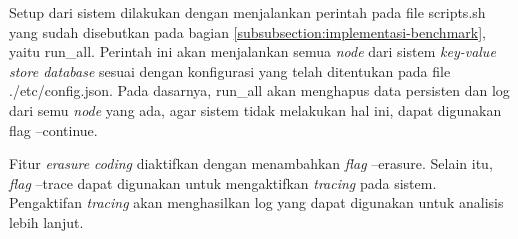 Setup dari sistem dilakukan dengan menjalankan perintah pada file scripts.sh yang sudah disebutkan pada bagian \ref{subsubsection:implementasi-benchmark}, yaitu run\_all. Perintah ini akan menjalankan semua \textit{node} dari sistem \textit{key-value store database} sesuai dengan konfigurasi yang telah ditentukan pada file ./etc/config.json. Pada dasarnya, run\_all akan menghapus data persisten dan log dari semu \textit{node} yang ada, agar sistem tidak melakukan hal ini, dapat digunakan flag --continue.

Fitur \textit{erasure coding} diaktifkan dengan menambahkan \textit{flag} --erasure. Selain itu, \textit{flag} --trace dapat digunakan untuk mengaktifkan \textit{tracing} pada sistem. Pengaktifan \textit{tracing} akan menghasilkan log yang dapat digunakan untuk analisis lebih lanjut.